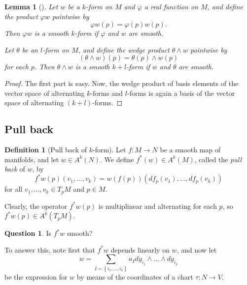 \documentclass[reqno]{amsart}
\newtheorem{lemma}[theorem]{Lemma}
\theoremstyle{definition}
\newtheorem{definition}[theorem]{Definition}
\newtheorem{question}[theorem]{Question}
\theoremstyle{remark}
\begin{document}
      \begin{lemma}[]
          Let $w$ be a $k$-form on $M$ and
          $\varphi $ a real function on $M$, and
          define the product $\varphi w$ pointwise
          by
          \[
          \varphi w (p) = \varphi (p) w(p).
          \] 
          Then $\varphi w$ is a smooth $k$-form if
          $\varphi $ and $w$ are smooth.

          Let $\theta$ be an $l$-form on $M$, and define
          the wedge product $\theta \wedge w$ pointwise
          by 
          \[
              \left( \theta \wedge w \right) (p)
              = \theta (p) \wedge w(p)
          \] 
          for each $p$. Then $\theta \wedge w$ is a smooth
          $k+l$-form if $w$ and $\theta$ are smooth.
      \end{lemma}

      \begin{proof}
          The first part is easy.
          Now, the wedge product of basis elements
          of the vector space of alternating $k$-forms and
          $l$-forms
          is again a basis of
          the vector space of alternating
          $(k+l)$-forms.
      \end{proof}

      \subsection{Pull back}

      \begin{definition}[Pull back of $k$-form]
          Let $f \colon M \to N$ be a smooth map of
          manifolds, and let
          $w \in A^{k}(N)$. We define
          $f^{*}(w) \in A^{k}(M)$, called the
          \textit{pull back} of $w$, by
          \[
          f^{*}w(p) (v_1,\ldots,v_k) = 
          w \left( f(p) \right) \left( 
          df_p (v_1), \ldots, df_p(v_k)\right) 
          \] 
          for all $v_1,\ldots, v_k \in T_pM$ and
          $p \in M$.
      \end{definition}

      Clearly, the operator
      $f^{*}w(p)$ is multiplinear and alternating
      for each $p$, so
      $f^{*}w(p) \in A^{k}(T_pM)$.

      \begin{question}
          Is $f^{*}w$ smooth?
      \end{question}

      To answer this, note first that
      $f^{*}w$ depends linearly on $w$, and
      now let
      \[
      w = \sum_{I = \left\{ i_1,\ldots, i_k \right\} }
      a_I dy_{i_1} \wedge \ldots \wedge
      dy_{i_k}
      \] 
      be the expression for $w$ by means of the coordinates
      of a chart $\tau \colon N \to V$.
    
\end{document}
